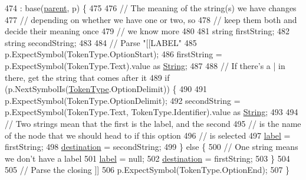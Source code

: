 \begin{DoxyCode}
474                                                                  : base(\hyperlink{a00077_af313a82103fcc2ff5a177dbb06b92f7b}{parent}, p) \{
475 
476                 \textcolor{comment}{// The meaning of the string(s) we have changes}
477                 \textcolor{comment}{// depending on whether we have one or two, so}
478                 \textcolor{comment}{// keep them both and decide their meaning once}
479                 \textcolor{comment}{// we know more}
480 
481                 \textcolor{keywordtype}{string} firstString;
482                 \textcolor{keywordtype}{string} secondString;
483 
484                 \textcolor{comment}{// Parse "[[LABEL"}
485                 p.ExpectSymbol(TokenType.OptionStart);
486                 firstString = p.ExpectSymbol(TokenType.Text).value as \hyperlink{a00040_a301aa7c866593a5b625a8fc158bbeacea27118326006d3829667a400ad23d5d98}{String};
487 
488                 \textcolor{comment}{// If there's a | in there, get the string that comes after it}
489                 \textcolor{keywordflow}{if} (p.NextSymbolIs(\hyperlink{a00040_a301aa7c866593a5b625a8fc158bbeace}{TokenType}.OptionDelimit)) \{
490 
491                     p.ExpectSymbol(TokenType.OptionDelimit);
492                     secondString = p.ExpectSymbol(TokenType.Text, TokenType.Identifier).value as 
      \hyperlink{a00040_a301aa7c866593a5b625a8fc158bbeacea27118326006d3829667a400ad23d5d98}{String};
493 
494                     \textcolor{comment}{// Two strings mean that the first is the label, and the second}
495                     \textcolor{comment}{// is the name of the node that we should head to if this option}
496                     \textcolor{comment}{// is selected}
497                     \hyperlink{a00075_a7f27d78e67fed6992767e995e70fc468}{label} = firstString;
498                     \hyperlink{a00075_abbe56fba06169901508e6c659f06c236}{destination} = secondString;
499                 \} \textcolor{keywordflow}{else} \{
500                     \textcolor{comment}{// One string means we don't have a label}
501                     \hyperlink{a00075_a7f27d78e67fed6992767e995e70fc468}{label} = null;
502                     \hyperlink{a00075_abbe56fba06169901508e6c659f06c236}{destination} = firstString;
503                 \}
504 
505                 \textcolor{comment}{// Parse the closing ]]}
506                 p.ExpectSymbol(TokenType.OptionEnd);
507             \}
\end{DoxyCode}



